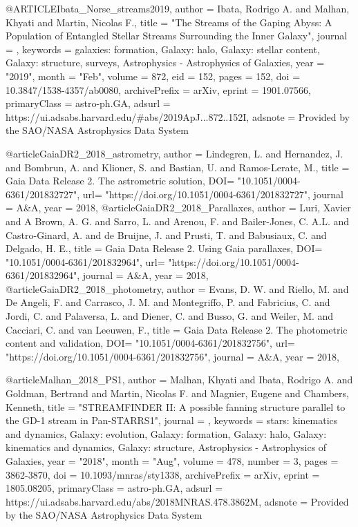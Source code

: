 \documentclass[apj]{emulateapj}
\begin{document}
{{@ARTICLE{Ibata_Norse_streams2019,
       author = {{Ibata}, Rodrigo A. and {Malhan}, Khyati and {Martin}, Nicolas F.},
        title = "{The Streams of the Gaping Abyss: A Population of Entangled Stellar Streams Surrounding the Inner Galaxy}",
      journal = {\apj},
     keywords = {galaxies: formation, Galaxy: halo, Galaxy: stellar content, Galaxy: structure, surveys, Astrophysics - Astrophysics of Galaxies},
         year = "2019",
        month = "Feb",
       volume = {872},
          eid = {152},
        pages = {152},
          doi = {10.3847/1538-4357/ab0080},
archivePrefix = {arXiv},
       eprint = {1901.07566},
 primaryClass = {astro-ph.GA},
       adsurl = {https://ui.adsabs.harvard.edu/\#abs/2019ApJ...872..152I},
      adsnote = {Provided by the SAO/NASA Astrophysics Data System}
}




@article{GaiaDR2_2018_astrometry,
	author = {{Lindegren, L.} and {Hernandez, J.} and {Bombrun, A.} and {Klioner, S.} and {Bastian, U.} and {Ramos-Lerate, M.}},
	title = {Gaia Data Release 2. The astrometric solution},
	DOI= "10.1051/0004-6361/201832727",
	url= "https://doi.org/10.1051/0004-6361/201832727",
	journal = {A\&A},
	year = 2018,
}
@article{GaiaDR2_2018_Parallaxes,
	author = {{Luri, Xavier} and {A Brown, A. G.} and {Sarro, L.} and {Arenou, F.} and {Bailer-Jones, C. A.L.} and {Castro-Ginard, A.} and {de Bruijne, J.} and {Prusti, T.} and {Babusiaux, C.} and {Delgado, H. E.}},
	title = {Gaia Data Release 2. Using Gaia parallaxes},
	DOI= "10.1051/0004-6361/201832964",
	url= "https://doi.org/10.1051/0004-6361/201832964",
	journal = {A\&A},
	year = 2018,
}
@article{GaiaDR2_2018_photometry,
	author = {{Evans, D. W.} and {Riello, M.} and {De Angeli, F.} and {Carrasco, J. M.} and {Montegriffo, P.} and {Fabricius, C.} and {Jordi, C.} and {Palaversa, L.} and {Diener, C.} and {Busso, G.} and {Weiler, M.} and {Cacciari, C.} and {van Leeuwen, F.}},
	title = {Gaia Data Release 2. The photometric content and validation},
	DOI= "10.1051/0004-6361/201832756",
	url= "https://doi.org/10.1051/0004-6361/201832756",
	journal = {A\&A},
	year = 2018,
}






@article{Malhan_2018_PS1,
       author = {{Malhan}, Khyati and {Ibata}, Rodrigo A. and {Goldman}, Bertrand and
         {Martin}, Nicolas F. and {Magnier}, Eugene and {Chambers}, Kenneth},
        title = "{STREAMFINDER II: A possible fanning structure parallel to the GD-1 stream in Pan-STARRS1}",
      journal = {\mnras},
     keywords = {stars: kinematics and dynamics, Galaxy: evolution, Galaxy: formation, Galaxy: halo, Galaxy: kinematics and dynamics, Galaxy: structure, Astrophysics - Astrophysics of Galaxies},
         year = "2018",
        month = "Aug",
       volume = {478},
       number = {3},
        pages = {3862-3870},
          doi = {10.1093/mnras/sty1338},
archivePrefix = {arXiv},
       eprint = {1805.08205},
 primaryClass = {astro-ph.GA},
       adsurl = {https://ui.adsabs.harvard.edu/abs/2018MNRAS.478.3862M},
      adsnote = {Provided by the SAO/NASA Astrophysics Data System}
}





}}
\end{document}
